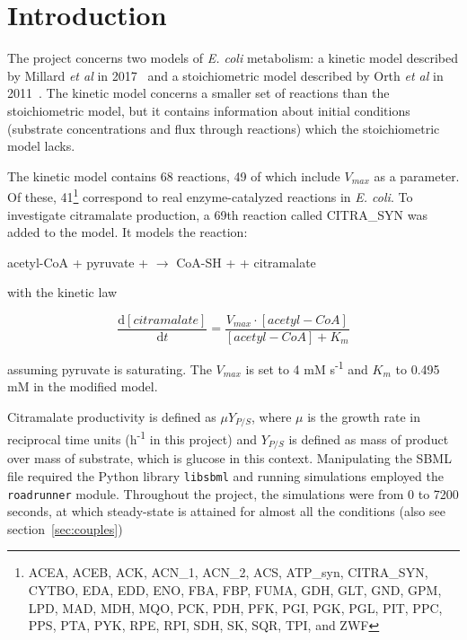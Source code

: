 \documentclass[parskip=full]{scrreprt}
\begin{document}
\chapter*{Introduction}
\label{ch:intro}

The project concerns two models of \emph{E. coli} metabolism: a kinetic model described by Millard \emph{et al} in 2017~\cite{millard_metabolic_2017} and a stoichiometric model described by Orth \emph{et al} in 2011~\cite{orth_comprehensive_2011}. The kinetic model concerns a smaller set of reactions than the stoichiometric model, but it contains information about initial conditions (substrate concentrations and flux through reactions) which the stoichiometric model lacks.

The kinetic model contains 68 reactions, 49 of which include $V_{max}$ as a parameter. Of these, 41\footnote{ACEA, ACEB, ACK, ACN\_1, ACN\_2, ACS, ATP\_syn, CITRA\_SYN, CYTBO, EDA, EDD, ENO, FBA, FBP, FUMA, GDH, GLT, GND, GPM, LPD, MAD, MDH, MQO, PCK, PDH, PFK, PGI, PGK, PGL, PIT, PPC, PPS, PTA, PYK, RPE, RPI, SDH, SK, SQR, TPI, and ZWF} correspond to real enzyme-catalyzed reactions in \emph{E. coli}. To investigate citramalate production, a 69th reaction called CITRA\_SYN was added to the model. It models the reaction:

\begin{center}
  acetyl-CoA + pyruvate +  $\rightarrow$ CoA-SH +  + citramalate
\end{center}

with the kinetic law

\[
  \frac{\mathrm{d}[citramalate]}{\mathrm{d}t} = 
  \frac{V_{max} \cdot [acetyl-CoA]}{[acetyl-CoA] + K_{m}}
\]

assuming pyruvate is saturating. The $V_{max}$ is set to 4 mM s\textsuperscript{-1} and $K_{m}$ to 0.495 mM in the modified model.

Citramalate productivity is defined as $\mu Y_{P/S}$, where $\mu$ is the growth rate in reciprocal time units (h\textsuperscript{-1} in this project) and $Y_{P/S}$ is defined as mass of product over mass of substrate, which is glucose in this context. Manipulating the SBML file required the Python library \texttt{libsbml} and running simulations employed the \texttt{roadrunner} module. Throughout the project, the simulations were from 0 to 7200 seconds, at which steady-state is attained for almost all the conditions (also see section~\vref{sec:couples}) %
\end{document}
